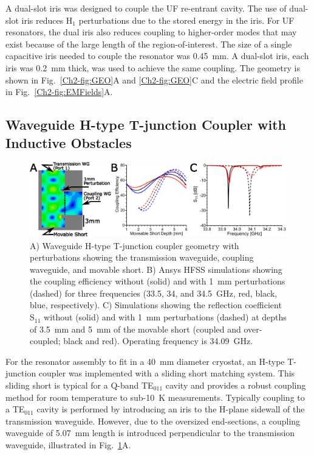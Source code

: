 A dual-slot iris was designed to couple the UF re-entrant \cylTE{} cavity. The use of dual-slot iris reduces H$_1$ perturbations due to the stored energy in the iris. For UF resonators, the dual iris also reduces coupling to higher-order modes that may exist because of the large length of the region-of-interest. \cite{UFLGR2017} The size of a single capacitive iris needed to couple the resonator was 0.45~mm. A dual-slot iris, each iris was 0.2~mm thick, was used to achieve the same coupling. The geometry is shown in Fig.~\ref{Ch2-fig:GEO}A and \ref{Ch2-fig:GEO}C and the electric field profile in Fig.~\ref{Ch2-fig:EMFields}A.

\subsection{Waveguide H-type T-junction Coupler with Inductive Obstacles}
\begin{figure}[htb]\centering
 \includegraphics[width=\textwidth]{Kapitel/Ch2-Images/04-CouplingPert.eps}
 \caption[Waveguide H-type T-junction coupler geometry.]{A) Waveguide H-type T-junction coupler geometry with perturbations showing the transmission waveguide, coupling waveguide, and movable short. B) Ansys HFSS simulations showing the coupling efficiency without (solid) and with 1~mm perturbations (dashed) for three frequencies (33.5, 34, and 34.5~GHz, red, black, blue, respectively). C) Simulations showing the reflection coefficient S$_{\text{11}}$ without (solid) and with 1~mm perturbations (dashed) at depths of 3.5~mm and 5~mm of the movable short (coupled and over-coupled; black and red). Operating frequency is 34.09~GHz.}
 \label{Ch2-fig:waveguide}
\end{figure}

For the resonator assembly to fit in a 40~mm diameter cryostat, an H-type T-junction coupler was implemented with a sliding short matching system. This sliding short is typical for a Q-band TE$_{011}$ cavity and provides a robust coupling method for room temperature to sub-10~K measurements. \cite{generalte011} Typically coupling to a TE$_{011}$ cavity is performed by introducing an iris to the H-plane sidewall of the transmission waveguide. However, due to the oversized end-sections, a coupling waveguide of 5.07~mm length is introduced perpendicular to the transmission waveguide, illustrated in Fig.~\ref{Ch2-fig:waveguide}A. 

